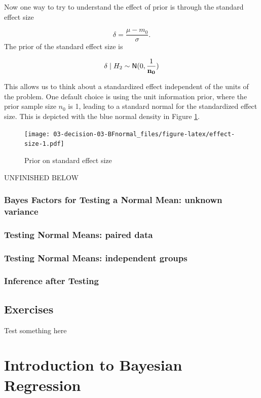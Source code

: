 \documentclass[]{book}
\theoremstyle{definition}
\theoremstyle{definition}
\theoremstyle{definition}
\theoremstyle{remark}
\begin{document}
Now one way to try to understand the effect of prior is through the
standard effect size

\[\delta = \frac{\mu - m_0}{\sigma}.\] The prior of the standard effect
size is

\[\delta \mid   H_2  \sim \textsf{N}(0, \frac{1}{\mathbf{n_0}})\]

This allows us to think about a standardized effect independent of the
units of the problem. One default choice is using the unit information
prior, where the prior sample size \(n_0\) is 1, leading to a standard
normal for the standardized effect size. This is depicted with the blue
normal density in Figure \ref{fig:effect-size}.

\begin{figure}
\centering
\texttt{[image: 03-decision-03-BFnormal\_files/figure-latex/effect-size-1.pdf]}
\caption{\label{fig:effect-size}Prior on standard effect size}
\end{figure}

UNFINISHED BELOW

\subsection{Bayes Factors for Testing a Normal Mean: unknown
variance}\label{bayes-factors-for-testing-a-normal-mean-unknown-variance}

\subsection{Testing Normal Means: paired
data}\label{testing-normal-means-paired-data}

\subsection{Testing Normal Means: independent
groups}\label{testing-normal-means-independent-groups}

\subsection{Inference after Testing}\label{inference-after-testing}

\section{Exercises}\label{exercises-1}

Test something here

\chapter{Introduction to Bayesian
Regression}\label{introduction-to-bayesian-regression}
\end{document}
